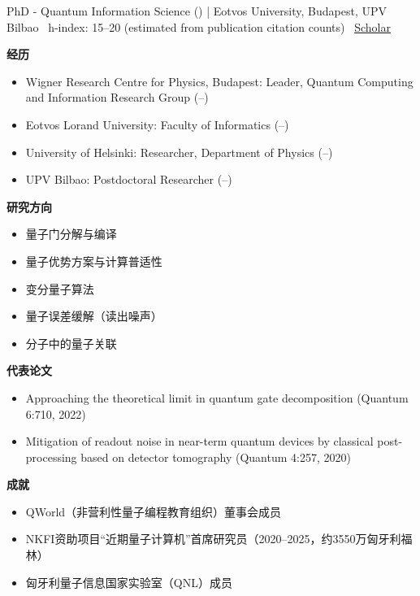 \vspace{4pt}
\par{\footnotesize\color{graytext}PhD - Quantum Information Science () | Eotvos University, Budapest, UPV Bilbao \textbar\  h-index: 15–20 (estimated from publication citation counts) \textbar\  \href{Not directly found via public search (likely exists but URL not indexed)}{Scholar}}
\par{\footnotesize\color{mainred}\textbf{经历}}
\begin{itemize}[leftmargin=1.2em,itemsep=0pt,topsep=0pt]
\item {\footnotesize Wigner Research Centre for Physics, Budapest: Leader, Quantum Computing and Information Research Group (–)}
\item {\footnotesize Eotvos Lorand University: Faculty of Informatics (–)}
\item {\footnotesize University of Helsinki: Researcher, Department of Physics (–)}
\item {\footnotesize UPV Bilbao: Postdoctoral Researcher (–)}
\end{itemize}
\par{\footnotesize\color{mainred}\textbf{研究方向}}
\begin{itemize}[leftmargin=1.2em,itemsep=0pt,topsep=0pt]
\item {\footnotesize 量子门分解与编译}
\item {\footnotesize 量子优势方案与计算普适性}
\item {\footnotesize 变分量子算法}
\item {\footnotesize 量子误差缓解（读出噪声）}
\item {\footnotesize 分子中的量子关联}
\end{itemize}
\par{\footnotesize\color{mainred}\textbf{代表论文}}
\begin{itemize}[leftmargin=1.2em,itemsep=0pt,topsep=0pt]
\item {\footnotesize Approaching the theoretical limit in quantum gate decomposition (Quantum 6:710, 2022)}
\item {\footnotesize Mitigation of readout noise in near-term quantum devices by classical post-processing based on detector tomography (Quantum 4:257, 2020)}
\end{itemize}
\par{\footnotesize\color{mainred}\textbf{成就}}
\begin{itemize}[leftmargin=1.2em,itemsep=0pt,topsep=0pt]
\item {\footnotesize QWorld（非营利性量子编程教育组织）董事会成员}
\item {\footnotesize NKFI资助项目“近期量子计算机”首席研究员（2020–2025，约3550万匈牙利福林）}
\item {\footnotesize 匈牙利量子信息国家实验室（QNL）成员}
\end{itemize}
